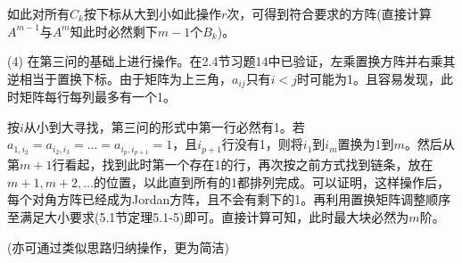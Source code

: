 \documentclass[a4paper,UTF8,fontset=windows]{ctexart}
\begin{document}
\begin{enumerate}
如此对所有$C_k$按下标从大到小如此操作$r$次，可得到符合要求的方阵(直接计算$A^{m-1}$与$A^m$知此时必然剩下$m-1$个$B_k$)。

(4) 在第三问的基础上进行操作。在2.4节习题14中已验证，左乘置换方阵并右乘其逆相当于置换下标。由于矩阵为上三角，$a_{ij}$只有$i<j$时可能为1。且容易发现，此时矩阵每行每列最多有一个1。

按$i$从小到大寻找，第三问的形式中第一行必然有1。若$a_{1,i_2}=a_{i_2,i_3}=\dots=a_{i_p,i_{p+1}}=1$，且$i_{p+1}$行没有1，则将$i_1$到$i_m$置换为1到$m$。然后从第$m+1$行看起，找到此时第一个存在1的行，再次按之前方式找到链条，放在$m+1,m+2,\dots$的位置，以此直到所有的1都排列完成。可以证明，这样操作后，每个对角方阵已经成为Jordan方阵，且不会有剩下的1。再利用置换矩阵调整顺序至满足大小要求(5.1节定理5.1-5)即可。直接计算可知，此时最大块必然为$m$阶。

(亦可通过类似思路归纳操作，更为简洁)
\end{enumerate}
\end{document}
